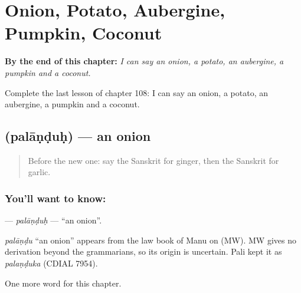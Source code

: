 
\chapter{Onion, Potato, Aubergine, Pumpkin, Coconut}
\label{ch:sa-onion-potato-aubergine-pumpkin-coconut}

\begin{chapteropening}
\textbf{By the end of this chapter:} \emph{I can say an onion, a potato, an aubergine, a pumpkin and a coconut.}

Complete the last lesson of chapter 108: I can say an onion, a potato, an aubergine, a pumpkin and a coconut.
\end{chapteropening}

\section[\texorpdfstring{\sk{पलाण्डुः} (palāṇḍuḥ)}{पलाण्डुः (palāṇḍuḥ)}]{ (palāṇḍuḥ) — an onion}

\label{lesson:SA-C108-palanduh}



\begin{quote}
Before the new one: say the Sanskrit for ginger, then the Sanskrit for garlic.
\end{quote}

\subsection*{You'll want to know: }
\textbf{} — \emph{palāṇḍuḥ} — \textquotedblleft{}an onion\textquotedblright{}.

\begin{cousinweb}
\emph{palāṇḍu} \textquotedblleft{}an onion\textquotedblright{} appears from the law book of Manu on (MW). MW gives no derivation beyond the grammarians, so its origin is uncertain. Pali kept it as \emph{palaṇḍuka} (CDIAL 7954).
\end{cousinweb}

\begin{grammarlens}[title={What you've built}]
One more word for this chapter.
\end{grammarlens}

